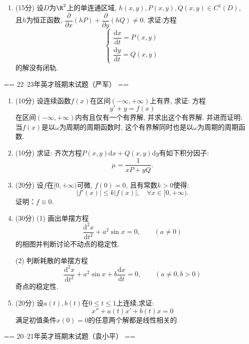 \begin{enumerate}
    \item (15分)
    设$D$为$\R^2$上的单连通区域, $h(x,y), P(x,y), Q(x,y) \in C^1(D)$, 
    且$h$为恒正函数, $\dfrac{\partial}{\partial x} (hP) + \dfrac{\partial}{\partial y}(hQ) \neq 0$. 求证:方程
    $$\begin{cases}
            \dfrac{\mathrm{d}x}{\mathrm{d}t} = P(x, y)\\
            \dfrac{\mathrm{d}y}{\mathrm{d}t} = Q(x, y)
    \end{cases}$$
    的解没有闭轨.
 \end{enumerate}

== 22--23年英才班期末试题（严军） ==
\begin{enumerate}
    \item (10分)
    设连续函数$f(x)$在区间$(-\infty, +\infty)$上有界, 求证: 方程
    $$y'+y = f(x)$$
    在区间$(-\infty, +\infty)$内有且仅有一个有界解, 并求出这个有界解. 
    并进而证明: 当$f(x)$是以$\omega$为周期的周期函数时, 
    这个有界解同时也是以$\omega$为周期的周期函数.
    \item (10分)
    求证: 齐次方程$P(x,y)\mathrm{d}x+Q(x,y)\mathrm{d}y$有如下积分因子:
    $$\mu = \frac{1}{xP+yQ}.$$
    \item (20分)
    设$f$在$[0,+\infty)$可微, $f(0) = 0$, 且有常数$k>0$使得:
    $$|f'(x)| \leqslant k |f(x)| , \quad \forall x \in [0,+\infty).$$
    证明：$f \equiv 0$.
    \item (30分)
    (1) 画出单摆方程
    $$\frac{\mathrm{d}^2x}{\mathrm{d}t^2} + a^2\sin x = 0, \qquad(a \neq 0)$$
    的相图并判断讨论不动点的稳定性.
    
    (2) 判断耗散的单摆方程
    $$\frac{\mathrm{d}^2x}{\mathrm{d}t^2} + a^2\sin x + b \frac{\mathrm{d}x}{\mathrm{d}t}= 0, \qquad(a \neq 0, b > 0)$$
    奇点的稳定性.
    
    \item (20分)
    设$a(t), b(t)$在$0 \leqslant t \leqslant 1$上连续,求证:
    $$x''+a(t)x' + b(t)x = 0$$
    满足初值条件$x(0) = 0$的任意两个解都是线性相关的.
    \end{enumerate}

== 20--21年英才班期末试题（袁小平） ==

